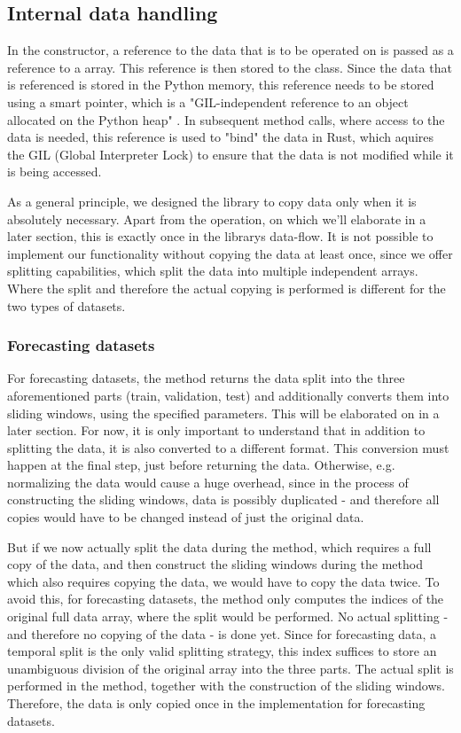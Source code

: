 \documentclass[review]{AIM_report}
\begin{document}
\subsection{Internal data handling}

In the constructor, a reference to the data that is to be operated on is passed as a reference to a \numpy array. This reference is then stored to the class. Since the data that is referenced is stored in the Python memory, this reference needs to be stored using a \py smart pointer, which is a "GIL-independent reference to an object allocated on the Python heap" \cite{PyO3PyStruct}. In subsequent method calls, where access to the data is needed, this reference is used to "bind" the data in Rust, which aquires the GIL (Global Interpreter Lock) to ensure that the data is not modified while it is being accessed.

As a general principle, we designed the library to copy data only when it is absolutely necessary. Apart from the \downsample operation, on which we'll elaborate in a later section, this is exactly once in the librarys data-flow. It is not possible to implement our functionality without copying the data at least once, since we offer splitting capabilities, which split the data into multiple independent arrays. Where the split and therefore the actual copying is performed is different for the two types of datasets.

\subsubsection{Forecasting datasets}

For forecasting datasets, the \collectFore method returns the data split into the three aforementioned parts (train, validation, test) and additionally converts them into sliding windows, using the specified parameters. This will be elaborated on in a later section. For now, it is only important to understand that in addition to splitting the data, it is also converted to a different format. This conversion must happen at the final step, just before returning the data. Otherwise, e.g. normalizing the data would cause a huge overhead, since in the process of constructing the sliding windows, data is possibly duplicated - and therefore all copies would have to be changed instead of just the original data.

But if we now actually split the data during the \splitShort method, which requires a full copy of the data, and then construct the sliding windows during the \collect method which also requires copying the data, we would have to copy the data twice. To avoid this, for forecasting datasets, the \splitShort method only computes the indices of the original full data array, where the split would be performed. No actual splitting - and therefore no copying of the data - is done yet. Since for forecasting data, a temporal split is the only valid splitting strategy, this index suffices to store an unambiguous division of the original array into the three parts. The actual split is performed in the \collect method, together with the construction of the sliding windows. Therefore, the data is only copied once in the implementation for forecasting datasets.
\end{document}

